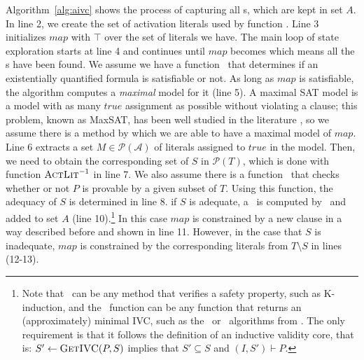 Algorithm~\ref{alg:aivc} shows the process of capturing all \mivc s,
which are kept in set $A$. In line 2, we create the set of activation
literals used by function \actlit . Line 3 initializes $map$ with
$\top$ over the set of literals we have. The main loop of state
exploration starts at line 4 and continues until $map$ becomes \unsat
which means all the \mivc s have been found. We assume we have a
function \checksat ~that determines if an existentially quantified
formula is satisfiable or not.
As long as $map$ is satisfiable, the algorithm computes a
\emph{maximal} \sat model for it (line 5). A maximal SAT model is a
model with as many $true$ assignment as possible without violating a
clause; this problem, known as MaxSAT, has been well studied in the
literature \cite{davies2011solving,
  morgado2013iterative}, so we assume there is a method by which we
are able to have a maximal model of $map$. Line 6 extracts a set $M
\in \mathcal{P} (\mathcal{A})$ of literals assigned to $true$ in the
model. Then, we need to obtain the corresponding set of $S$ in
$\mathcal{P}(T)$, which is done with function $\textsc{ActLit} ^{-1}$ in line
7. We also assume there is a function \isadeq ~that checks whether or
not $P$ is provable by a given subset of $T$. Using this function, the
adequacy of $S$ is determined in line 8. if $S$ is adequate, a \mivc
~is computed by \getivc ~and added to set $A$ (line 10).\footnote{Note
  that \isadeq ~can be any method that verifies a safety property,
  such as K-induction, and the \getivc\ function can be any function
  that returns an (approximately) minimal IVC, such as the \ucalg\ or
  \ucbfalg\ algorithms from \cite{Ghass16}. The only requirement is
  that it follows the definition of an inductive validity core, that
  is: $S' \leftarrow \textsc{GetIVC} (P, S)$ implies that $S' \subseteq S$ and
  $(I, S') \vdash P$.} In this case $map$ is constrained by a new
clause in a way described before and shown in line 11. However, in the
case that $S$ is inadequate, $map$ is constrained by the corresponding
literals from $T \setminus S$ in lines (12-13).

